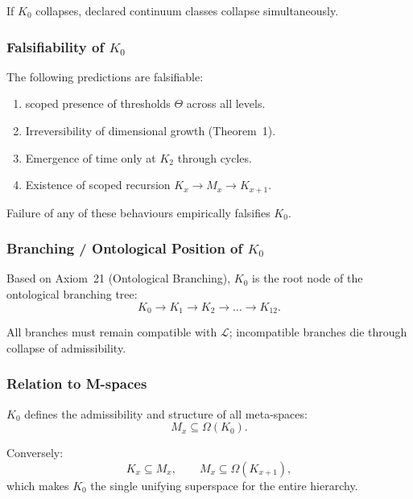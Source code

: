 If $K_0$ collapses, declared continuum classes collapse simultaneously.

\subsubsection{Falsifiability of \texorpdfstring{$K_0$}{K_0}}

The following predictions are falsifiable:
\begin{enumerate}
    \item scoped presence of thresholds $\Theta$ across all levels.
    \item Irreversibility of dimensional growth (Theorem~1).
    \item Emergence of time only at $K_2$ through cycles.
    \item Existence of scoped recursion $K_x\to M_x\to K_{x+1}$.
\end{enumerate}

Failure of any of these behaviours empirically falsifies $K_0$.

\subsubsection{Branching / Ontological Position of \texorpdfstring{$K_0$}{K_0}}

Based on Axiom~21 (Ontological Branching), $K_0$ is the root node of the
ontological branching tree:
\[
K_0 \rightarrow K_1 \rightarrow K_2 \rightarrow \dots \rightarrow K_{12}.
\]

All branches must remain compatible with $\mathcal{L}$; incompatible
branches die through collapse of admissibility.

\subsubsection{Relation to M-spaces}

$K_0$ defines the admissibility and structure of all meta-spaces:
\[
M_x \subseteq \Omega(K_0).
\]

Conversely:
\[
K_x \subseteq M_x,
\qquad
M_x \subseteq \Omega(K_{x+1}),
\]
which makes $K_0$ the single unifying superspace for the entire
hierarchy.
